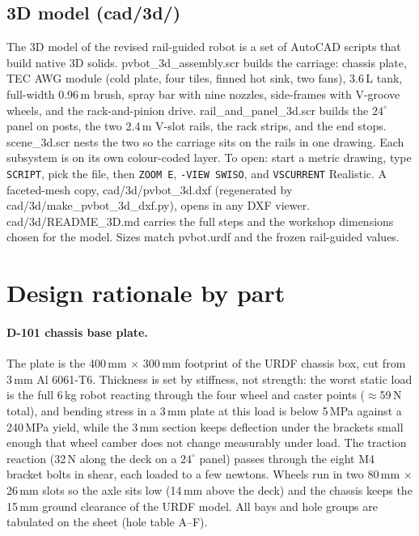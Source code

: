 \documentclass[11pt,a4paper]{article}
\newcommand{\fpath}[1]{{\ttfamily\small #1}}
\begin{document}
\subsection{3D model (\fpath{cad/3d/})}
\label{sec:register3d}
The 3D model of the revised rail-guided robot is a set of AutoCAD scripts that
build native 3D solids. \fpath{pvbot\_3d\_assembly.scr} builds the carriage:
chassis plate, TEC AWG module (cold plate, four tiles, finned hot sink, two
fans), 3.6\,L tank, full-width 0.96\,m brush, spray bar with nine nozzles,
side-frames with V-groove wheels, and the rack-and-pinion drive.
\fpath{rail\_and\_panel\_3d.scr} builds the $24^\circ$ panel on posts, the two
2.4\,m V-slot rails, the rack strips, and the end stops.
\fpath{scene\_3d.scr} nests the two so the carriage sits on the rails in one
drawing. Each subsystem is on its own colour-coded layer. To open: start a
metric drawing, type \texttt{SCRIPT}, pick the file, then \texttt{ZOOM E},
\texttt{-VIEW SWISO}, and \texttt{VSCURRENT} Realistic. A faceted-mesh copy,
\fpath{cad/3d/pvbot\_3d.dxf} (regenerated by
\fpath{cad/3d/make\_pvbot\_3d\_dxf.py}), opens in any DXF viewer.
\fpath{cad/3d/README\_3D.md} carries the full steps and the workshop
dimensions chosen for the model. Sizes match \fpath{pvbot.urdf} and the frozen
rail-guided values.

\section{Design rationale by part}

\paragraph{D-101 chassis base plate.}
The plate is the 400\,mm $\times$ 300\,mm footprint of the URDF chassis box,
cut from 3\,mm Al 6061-T6. Thickness is set by stiffness, not strength: the
worst static load is the full 6\,kg robot reacting through the four wheel and
caster points ($\approx$59\,N total), and bending stress in a 3\,mm plate at
this load is below 5\,MPa against a 240\,MPa yield, while the 3\,mm section
keeps deflection under the brackets small enough that wheel camber does not
change measurably under load. The traction reaction (32\,N along the deck on
a $24^\circ$ panel) passes through the eight M4 bracket bolts in shear, each
loaded to a few newtons. Wheels run in two 80\,mm $\times$ 26\,mm slots so
the axle sits low (14\,mm above the deck) and the chassis keeps the 15\,mm
ground clearance of the URDF model. All bays and hole groups are tabulated
on the sheet (hole table A--F).
\end{document}
